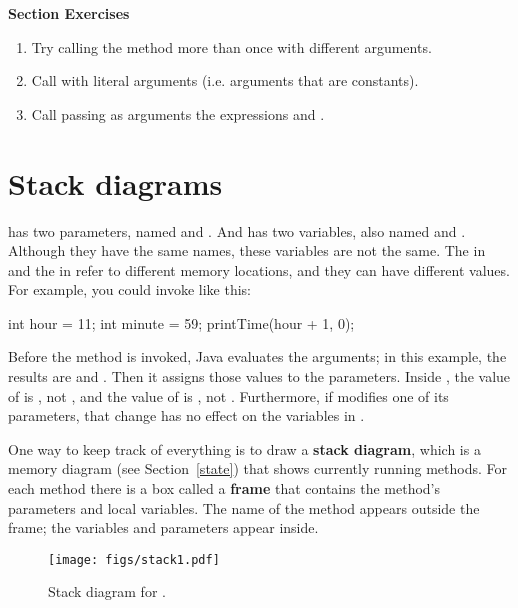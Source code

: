 \textbf{Section Exercises}
\begin{enumerate}
\item Try calling the method  more than once with different arguments.
\item Call  with literal arguments (i.e. arguments that are constants).
\item Call  passing as arguments the expressions  and .
\end{enumerate}

\section{Stack diagrams}
\label{stack}

 has two parameters, named  and .
And  has two variables, also named  and .
Although they have the same names, these variables are not the same.
The  in  and the  in  refer to different memory locations, and they can have different values.
For example, you could invoke  like this:

\begin{code}
int hour = 11;
int minute = 59;
printTime(hour + 1, 0);
\end{code}

Before the method is invoked, Java evaluates the arguments; in this example, the results are  and .
Then it assigns those values to the parameters.
Inside , the value of  is , not , and the value of  is , not .
Furthermore, if  modifies one of its parameters, that change has no effect on the variables in .



One way to keep track of everything is to draw a {\bf stack diagram}, which is a memory diagram (see Section~\ref{state}) that shows currently running methods.
For each method there is a box called a {\bf frame} that contains the method's parameters and local variables.
The name of the method appears outside the frame; the variables and parameters appear inside.

\begin{figure}[!ht]
\begin{center}
\texttt{[image: figs/stack1.pdf]}
\caption{Stack diagram for .}
\label{fig.stack}
\end{center}
\end{figure}

